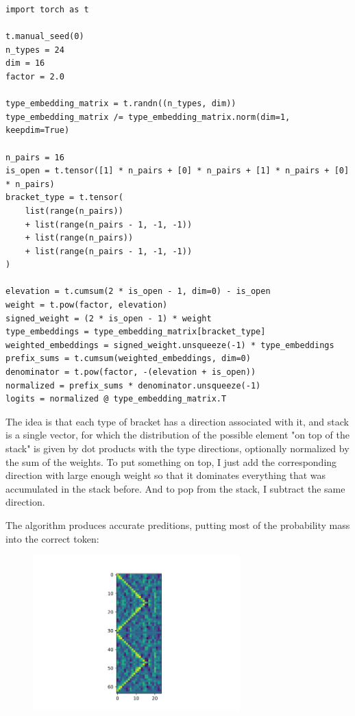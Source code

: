 \documentclass[a4paper, 11pt, oneside]{article}
\begin{document}
	\begin{verbatim}
import torch as t

t.manual_seed(0)
n_types = 24
dim = 16
factor = 2.0

type_embedding_matrix = t.randn((n_types, dim))
type_embedding_matrix /= type_embedding_matrix.norm(dim=1, keepdim=True)

n_pairs = 16
is_open = t.tensor([1] * n_pairs + [0] * n_pairs + [1] * n_pairs + [0] * n_pairs)
bracket_type = t.tensor(
    list(range(n_pairs))
    + list(range(n_pairs - 1, -1, -1))
    + list(range(n_pairs))
    + list(range(n_pairs - 1, -1, -1))
)

elevation = t.cumsum(2 * is_open - 1, dim=0) - is_open
weight = t.pow(factor, elevation)
signed_weight = (2 * is_open - 1) * weight
type_embeddings = type_embedding_matrix[bracket_type]
weighted_embeddings = signed_weight.unsqueeze(-1) * type_embeddings
prefix_sums = t.cumsum(weighted_embeddings, dim=0)
denominator = t.pow(factor, -(elevation + is_open))
normalized = prefix_sums * denominator.unsqueeze(-1)
logits = normalized @ type_embedding_matrix.T
\end{verbatim}

	The idea is that each type of bracket has a direction associated with it, and stack
	is a single vector, for which the distribution of the possible element "on top
	of the stack" is given by dot products with the type directions, optionally normalized
	by the sum of the weights. To put something on top, I just add the corresponding
	direction with large enough weight so that it dominates everything that was accumulated
	in the stack before. And to pop from the stack, I subtract the same direction.

	The algorithm produces accurate preditions, putting most of the probability
	mass into the correct token:

	\begin{figure}[t]
		\includegraphics[width=8cm]{img/mech.png}
		\centering
	\end{figure}
\end{document}
